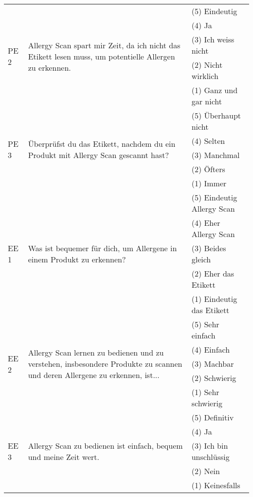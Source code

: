 \begin{longtable}{p{1cm} p{8cm} p{5.5cm}}
\hline

\multirow{5}{*}{PE 2}
& \multirow{5}{8cm}{Allergy Scan spart mir Zeit, da ich nicht das Etikett lesen muss, um potentielle Allergen zu erkennen.}
& (5) Eindeutig\\ 
& & (4) Ja\\
& & (3) Ich weiss nicht\\
& & (2) Nicht wirklich\\
& & (1) Ganz und gar nicht\\

\hline

\multirow{5}{*}{PE 3}
& \multirow{5}{8cm}{Überprüfst du das Etikett, nachdem du ein Produkt mit Allergy Scan gescannt hast?}
& (5) Überhaupt nicht\\ 
& & (4) Selten\\
& & (3) Manchmal\\
& & (2) Öfters\\
& & (1) Immer\\

\hline

\multirow{5}{*}{EE 1}
& \multirow{5}{8cm}{Was ist bequemer für dich, um Allergene in einem Produkt zu erkennen?}
& (5) Eindeutig Allergy Scan\\ 
& & (4) Eher Allergy Scan\\
& & (3) Beides gleich\\
& & (2) Eher das Etikett\\
& & (1) Eindeutig das Etikett\\

\hline

\multirow{5}{*}{EE 2}
& \multirow{5}{8cm}{Allergy Scan lernen zu bedienen und zu verstehen, insbesondere Produkte zu scannen und deren Allergene zu erkennen, ist...}
& (5) Sehr einfach\\ 
& & (4) Einfach\\
& & (3) Machbar\\
& & (2) Schwierig\\
& & (1) Sehr schwierig\\

\hline

\multirow{5}{*}{EE 3}
& \multirow{5}{8cm}{Allergy Scan zu bedienen ist einfach, bequem und meine Zeit wert.}
& (5) Definitiv\\ 
& & (4) Ja\\
& & (3) Ich bin unschlüssig\\
& & (2) Nein\\
& & (1) Keinesfalls\\

\bottomrule

\end{longtable}